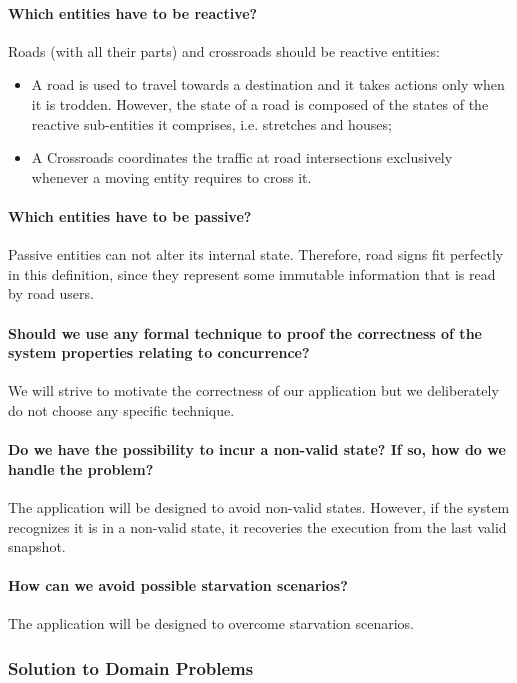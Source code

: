 \paragraph{Which entities have to be reactive?} 
Roads (with all their parts) and crossroads should be reactive entities:
\begin{itemize}
  \item A road is used to travel towards a destination 
  and it takes actions only when it is trodden. 
  However, the state of a road is composed of the states 
  of the reactive sub-entities it comprises, i.e. stretches and houses;
  \item A Crossroads coordinates the traffic at road intersections 
  exclusively whenever a moving entity requires to cross it.
\end{itemize}

\paragraph{Which entities have to be passive?} 
Passive entities can not alter its internal state. 
Therefore, road signs fit perfectly in this definition, since
they represent some immutable information that is read by road users.

\paragraph{Should we use any formal technique to proof the correctness 
of the system properties relating to concurrence?} 
We will strive to motivate the correctness of our application 
but we deliberately do not choose any specific technique.

\paragraph{Do we have the possibility to incur a non-valid state? 
If so, how do we handle the problem?} 
The application will be designed to avoid non-valid states. 
However, if the system recognizes it is in a non-valid state, 
it recoveries the execution from the last valid snapshot.

\paragraph{How can we avoid possible starvation scenarios?} 
The application will be designed to overcome starvation scenarios.

\subsubsection{Solution to Domain Problems}

